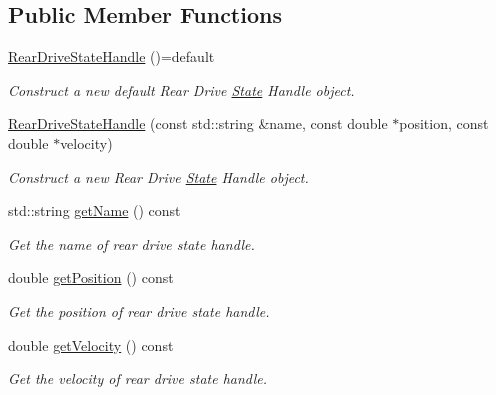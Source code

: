\subsection*{Public Member Functions}
\begin{DoxyCompactItemize}
\item 
\mbox{\label{classhardware__interface_1_1RearDriveStateHandle_aeb3d292f47c5dc8bc2225534ffdb4b99}} 
\hyperlink{classhardware__interface_1_1RearDriveStateHandle_aeb3d292f47c5dc8bc2225534ffdb4b99}{Rear\+Drive\+State\+Handle} ()=default
\begin{DoxyCompactList}\small\item\em Construct a new default Rear Drive \hyperlink{structState}{State} Handle object. \end{DoxyCompactList}\item 
\hyperlink{classhardware__interface_1_1RearDriveStateHandle_abf8b4ca793044ef32d878647b792e8d3}{Rear\+Drive\+State\+Handle} (const std\+::string \&name, const double $\ast$position, const double $\ast$velocity)
\begin{DoxyCompactList}\small\item\em Construct a new Rear Drive \hyperlink{structState}{State} Handle object. \end{DoxyCompactList}\item 
std\+::string \hyperlink{classhardware__interface_1_1RearDriveStateHandle_a0997cace8fbf80dd1463f4d24f1306b9}{get\+Name} () const
\begin{DoxyCompactList}\small\item\em Get the name of rear drive state handle. \end{DoxyCompactList}\item 
double \hyperlink{classhardware__interface_1_1RearDriveStateHandle_a685188a6227b2b8abadfd94e2ba4bd2c}{get\+Position} () const
\begin{DoxyCompactList}\small\item\em Get the position of rear drive state handle. \end{DoxyCompactList}\item 
double \hyperlink{classhardware__interface_1_1RearDriveStateHandle_a6da155c9a5a064004367837a4fd9d968}{get\+Velocity} () const
\begin{DoxyCompactList}\small\item\em Get the velocity of rear drive state handle. \end{DoxyCompactList}\item 

\end{DoxyCompactItemize}

